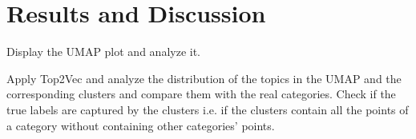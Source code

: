 \documentclass[a4paper]{article}
\begin{document}
\section* {Results and Discussion}

Display the UMAP plot and analyze it.

Apply Top2Vec and analyze the distribution of the topics in the UMAP and the corresponding clusters and compare them with the real categories. Check if the true labels are captured by the clusters i.e. if the clusters contain all the points of a category without containing other categories' points.










\end{document}
